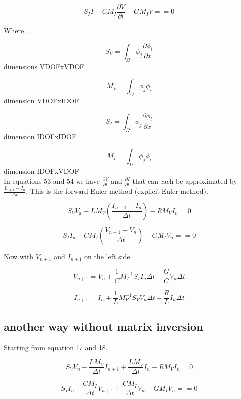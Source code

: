 \documentclass[12pt, letterpaper]{article}
\begin{document}
\begin{equation}
	S_I I - C M_I \frac{\partial V}{\partial t} - G M_I V = 
	= 0
\end{equation}

Where ...

\[S_V = \int_\Omega \phi_j \frac{\partial \phi_i}{\partial x}\]
dimensions VDOFxVDOF

\[M_V = \int_\Omega \phi_j \phi_i\]
dimension VDOFxIDOF

\[S_I = \int_\Omega \phi_j \frac{\partial \phi_i}{\partial x}\]
dimension IDOFxIDOF

\[M_I = \int_\Omega \phi_j \phi_i\]
dimension IDOFxVDOF\\


In equations 53 and 54 we have $\frac{\partial V}{\partial t}$ and $\frac{\partial I}{\partial t}$ that can each be approximated by $\frac{I_{n+1}-I_n}{\Delta t}$. This is the forward Euler method (explicit Euler method).

\begin{equation}
	S_V V_n - L M_V (\frac{I_{n+1}-I_n}{\Delta t}) - R M_V I_n
	= 0
\end{equation}

\begin{equation}
	S_I I_n - C M_I (\frac{V_{n+1}-V_n}{\Delta t}) - G M_I V_n = 
	= 0
\end{equation}


Now with $V_{n+1}$ and $I_{n+1}$ on the left side.

\begin{equation}
	V_{n+1} = V_n + \frac{1}{C} M_I^{-1} S_I I_n \Delta t - \frac{G}{C} V_n \Delta t
\end{equation}

\begin{equation}
	I_{n+1} =  I_n + \frac{1}{L} M_V^{-1} S_V V_n \Delta t - \frac{R}{L} I_n \Delta t
\end{equation}

\subsection{another way without matrix inversion}
Starting from equation 17 and 18.

\begin{equation}
	S_V V_n - \frac{L M_V}{\Delta t} I_{n+1} + \frac{L M_V}{\Delta t} I_n - R M_V I_n
	= 0
\end{equation}

\begin{equation}
	S_I I_n - \frac{C M_I}{\Delta t} V_{n+1} + \frac{C M_I}{\Delta t} V_n - G M_I V_n = 
	= 0
\end{equation}
\end{document}
